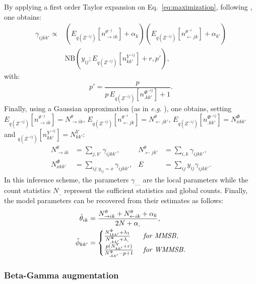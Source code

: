 By applying a first order Taylor expansion on Eq.~\eqref{eq:maximization}, following \cite{teh2007collapsed}, one obtains:
%
\begin{align*}
\gamma_{ijkk'} \propto & (E_{q({Z}^{-ij})}[n_{\rightarrow ik}^{\theta^{-j}}] + \alpha_k) (E_{q({Z}^{-ij})}[n_{\leftarrow jk}^{\theta^{-i}}] + \alpha_{k'}) \\
& \mathrm{NB}\left(y_{ij}; E_{q({Z}^{-ij})}[n^{{Y}^{-ij}}_{kk'}] + r,  p' \right),
\end{align*}
%
with:
%
\[
p' = \frac{p}{p\,E_{q({Z}^{-ij})}[n^{\Phi^{-ij}}_{\bm{.}kk'}] + 1}.
\]
%
Finally, using a Gaussian approximation (as in \textit{e.g.} \cite{asuncion2009smoothing}), one obtains, setting $E_{q({Z}^{-ij})}[n_{\rightarrow ik}^{\theta^{-j}}] = N^{\theta}_{\rightarrow ik}$, $E_{q({Z}^{-ij})}[n_{\leftarrow jk}^{\theta^{-i}}] = N^{\theta}_{\leftarrow jk'}$, $E_{q({Z}^{-ij})}[n^{\Phi^{-ij}}_{\bm{.}kk'}] = N^{\Phi}_{xkk'}$ and $_{q({Z}^{-ij})}[n^{{Y}^{-ij}}_{kk'}] = N^{{Y}}_{kk'}$:
%
\begin{align} \label{eq:sss}
   N^{\theta}_{\rightarrow ik} &= \sum_{j, k'} \gamma_{ijkk'},       & N^{\theta}_{\leftarrow jk'} &= \sum_{i, k} \gamma_{ijkk'},  \nonumber \\
   N^{\Phi}_{xkk'} &= \sum_{ij:y_{ij}=x} \gamma_{ijkk'},  & E &= \sum_{ij} y_{ij}\gamma_{ijkk'}.
\end{align}
%
In this inference scheme, the parameters $\gamma_{....}$ are the local parameters while the count statistics $N^{.}_{..}$ represent the sufficient statistics and global counts. Finally, the model parameters can be recovered from their estimates as follows:
%
\begin{align*}
\hat \theta_{ik} &= \frac{N^{\theta}_{\rightarrow ik} + N^{\theta}_{\leftarrow ik} + \alpha_k}{2N + \alpha_{\bm{.}}}, \\
\hat \phi_{kk'}&=\begin{cases}
     \frac{N^{\Phi}_{1 kk'} + \lambda_1}{N^{\Phi}_{\bm{.}kk'} + \lambda_{\bm{.}}} & \textrm{ \textit{for MMSB}}, \\
    \frac{p(N^{Y}_{kk'} + r)}{N^{\Phi}_{\bm{.}kk'} - p + 1}  & \textrm{ \textit{for WMMSB}}.  %
    \end{cases}
\end{align*}

\subsubsection{Beta-Gamma augmentation} 

